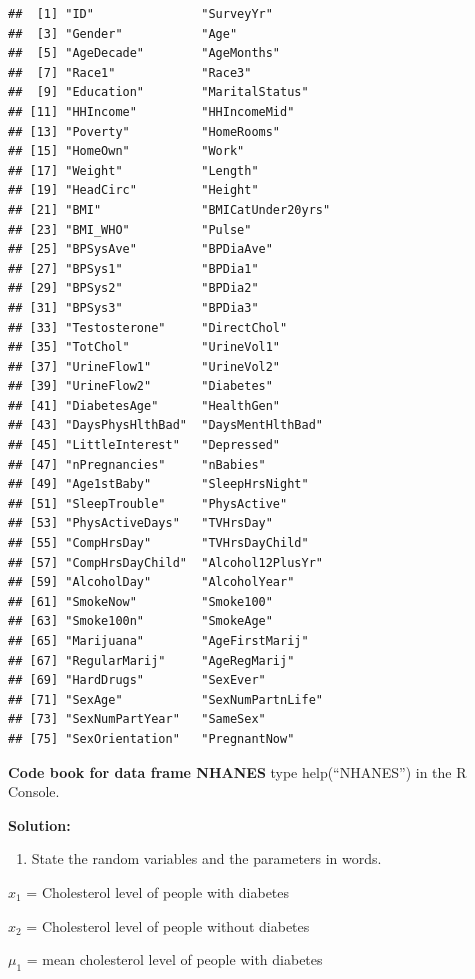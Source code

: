 \documentclass[
]{book}
\providecommand{\tightlist}{%
  \setlength{\itemsep}{0pt}\setlength{\parskip}{0pt}}
\begin{document}
\begin{verbatim}
##  [1] "ID"               "SurveyYr"        
##  [3] "Gender"           "Age"             
##  [5] "AgeDecade"        "AgeMonths"       
##  [7] "Race1"            "Race3"           
##  [9] "Education"        "MaritalStatus"   
## [11] "HHIncome"         "HHIncomeMid"     
## [13] "Poverty"          "HomeRooms"       
## [15] "HomeOwn"          "Work"            
## [17] "Weight"           "Length"          
## [19] "HeadCirc"         "Height"          
## [21] "BMI"              "BMICatUnder20yrs"
## [23] "BMI_WHO"          "Pulse"           
## [25] "BPSysAve"         "BPDiaAve"        
## [27] "BPSys1"           "BPDia1"          
## [29] "BPSys2"           "BPDia2"          
## [31] "BPSys3"           "BPDia3"          
## [33] "Testosterone"     "DirectChol"      
## [35] "TotChol"          "UrineVol1"       
## [37] "UrineFlow1"       "UrineVol2"       
## [39] "UrineFlow2"       "Diabetes"        
## [41] "DiabetesAge"      "HealthGen"       
## [43] "DaysPhysHlthBad"  "DaysMentHlthBad" 
## [45] "LittleInterest"   "Depressed"       
## [47] "nPregnancies"     "nBabies"         
## [49] "Age1stBaby"       "SleepHrsNight"   
## [51] "SleepTrouble"     "PhysActive"      
## [53] "PhysActiveDays"   "TVHrsDay"        
## [55] "CompHrsDay"       "TVHrsDayChild"   
## [57] "CompHrsDayChild"  "Alcohol12PlusYr" 
## [59] "AlcoholDay"       "AlcoholYear"     
## [61] "SmokeNow"         "Smoke100"        
## [63] "Smoke100n"        "SmokeAge"        
## [65] "Marijuana"        "AgeFirstMarij"   
## [67] "RegularMarij"     "AgeRegMarij"     
## [69] "HardDrugs"        "SexEver"         
## [71] "SexAge"           "SexNumPartnLife" 
## [73] "SexNumPartYear"   "SameSex"         
## [75] "SexOrientation"   "PregnantNow"
\end{verbatim}

\textbf{Code book for data frame NHANES} type help(``NHANES'') in the R Console.

\textbf{Solution:}

\begin{enumerate}
\def\labelenumi{\arabic{enumi}.}
\tightlist
\item
  State the random variables and the parameters in words.
\end{enumerate}

\(x_1\) = Cholesterol level of people with diabetes

\(x_2\) = Cholesterol level of people without diabetes

\(\mu_1\) = mean cholesterol level of people with diabetes
\end{document}
